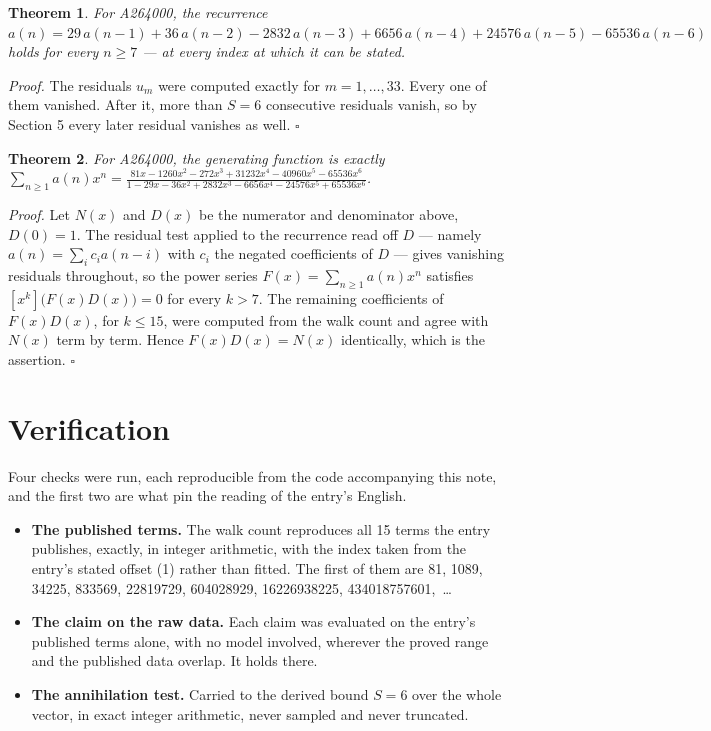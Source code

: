 \documentclass[11pt]{article}
\newtheorem{theorem}{Theorem}
\theoremstyle{definition}
\begin{document}
\begin{theorem} For A264000, the recurrence $a(n) = 29\,a(n-1) + 36\,a(n-2) - 2832\,a(n-3) + 6656\,a(n-4) + 24576\,a(n-5) - 65536\,a(n-6)$ holds for every $n \ge 7$ --- at every index at which it can be stated.\end{theorem}

{\itshape Proof.} The residuals $u_m$ were computed exactly for $m = 1,\dots,33$. Every one of them vanished. After it, more than $S = 6$ consecutive residuals vanish, so by Section 5 every later residual vanishes as well. $\square$

\begin{theorem} For A264000, the generating function is exactly $\sum_{n\ge 1} a(n)x^n = \frac{81x - 1260x^{2} - 272x^{3} + 31232x^{4} - 40960x^{5} - 65536x^{6}}{1 - 29x - 36x^{2} + 2832x^{3} - 6656x^{4} - 24576x^{5} + 65536x^{6}}$.\end{theorem}

{\itshape Proof.} Let $N(x)$ and $D(x)$ be the numerator and denominator above, $D(0)=1$. The residual test applied to the recurrence read off $D$ --- namely $a(n) = \sum_i c_i a(n-i)$ with $c_i$ the negated coefficients of $D$ --- gives vanishing residuals throughout, so the power series $F(x)=\sum_{n\ge 1}a(n)x^n$ satisfies $[x^k]\bigl(F(x)D(x)\bigr) = 0$ for every $k > 7$. The remaining coefficients of $F(x)D(x)$, for $k \le 15$, were computed from the walk count and agree with $N(x)$ term by term. Hence $F(x)D(x) = N(x)$ identically, which is the assertion. $\square$

\section{Verification}

Four checks were run, each reproducible from the code accompanying this note, and the first two are what pin the reading of the entry's English.

\begin{itemize}

\item {\bfseries The published terms.} The walk count reproduces all 15 terms the entry publishes, exactly, in integer arithmetic, with the index taken from the entry's stated offset (1) rather than fitted. The first of them are 81, 1089, 34225, 833569, 22819729, 604028929, 16226938225, 434018757601,~\dots

\item {\bfseries The claim on the raw data.} Each claim was evaluated on the entry's published terms alone, with no model involved, wherever the proved range and the published data overlap. It holds there.

\item {\bfseries The annihilation test.} Carried to the derived bound $S = 6$ over the whole vector, in exact integer arithmetic, never sampled and never truncated.

\end{itemize}
\end{document}
